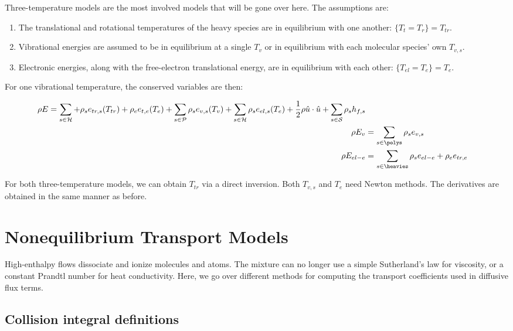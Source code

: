 \documentclass[10pt]{article}
\begin{document}
\begin{flushleft}
Three-temperature models are the most involved models that will be gone over here. The assumptions are:

\begin{enumerate}
    \item The translational and rotational temperatures of the heavy species are in equilibrium with one another: $\{T_t = T_r\} = T_{tr}$.
    \item Vibrational energies are assumed to be in equilibrium at a single $T_v$ or in equilibrium with each molecular species' own $T_{v,s}$.
    \item Electronic energies, along with the free-electron translational energy, are in equilibrium with each other: $\{T_{el} = T_e\} = T_{e}$.
\end{enumerate}

For one vibrational temperature, the conserved variables are then:

\begin{align}
    \rho E = \sum_{s \in \mathcal{H}} + \rho_s e_{tr,s} (T_{tr}) + \rho_e e_{t,e} (T_{e}) + \sum_{s \in \mathcal{P}} \rho_s e_{v,s} (T_{v}) + \sum_{s \in \mathcal{H}} \rho_s e_{el,s} (T_{e}) + \frac{1}{2} \rho \hat{u} \cdot \hat{u} + \sum_{s \in \mathcal{S}} \rho_s h_{f,s} \\
    \rho E_v &= \sum_{s \in \polys} \rho_s e_{v,s} \\
    \rho E_{el-e} &=  \sum_{s \in \heavies} \rho_s e_{el-e} + \rho_e e_{tr,e}
\end{align}

For both three-temperature models, we can obtain $T_{tr}$ via a direct inversion. Both $T_{v,s}$ and $T_e$ need Newton methods. The derivatives are obtained in the same manner as before.

\newpage
\section{Nonequilibrium Transport Models}

High-enthalpy flows dissociate and ionize molecules and atoms. The mixture can no longer use a simple Sutherland's law for viscosity, or a constant Prandtl number for heat conductivity. Here, we go over different methods for computing the transport coefficients used in diffusive flux terms.

\subsection{Collision integral definitions}


\end{flushleft}
\end{document}
